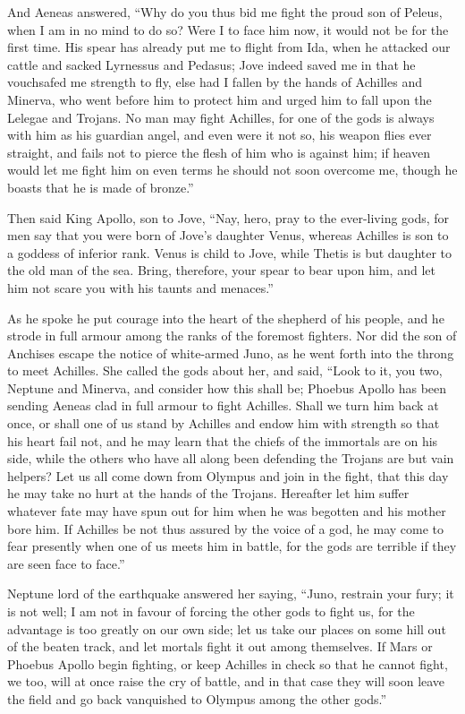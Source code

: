 And Aeneas answered, “Why do you thus bid me fight the proud son of
Peleus, when I am in no mind to do so? Were I to face him now, it would
not be for the first time. His spear has already put me to flight from
Ida, when he attacked our cattle and sacked Lyrnessus and Pedasus; Jove
indeed saved me in that he vouchsafed me strength to fly, else had I
fallen by the hands of Achilles and Minerva, who went before him to
protect him and urged him to fall upon the Lelegae and Trojans. No man may
fight Achilles, for one of the gods is always with him as his guardian
angel, and even were it not so, his weapon flies ever straight, and fails
not to pierce the flesh of him who is against him; if heaven would let me
fight him on even terms he should not soon overcome me, though he boasts
that he is made of bronze.”

Then said King Apollo, son to Jove, “Nay, hero, pray to the ever-living
gods, for men say that you were born of Jove’s daughter Venus, whereas
Achilles is son to a goddess of inferior rank. Venus is child to Jove,
while Thetis is but daughter to the old man of the sea. Bring, therefore,
your spear to bear upon him, and let him not scare you with his taunts and
menaces.”

As he spoke he put courage into the heart of the shepherd of his people,
and he strode in full armour among the ranks of the foremost fighters. Nor
did the son of Anchises escape the notice of white-armed Juno, as he went
forth into the throng to meet Achilles. She called the gods about her, and
said, “Look to it, you two, Neptune and Minerva, and consider how this
shall be; Phoebus Apollo has been sending Aeneas clad in full armour to
fight Achilles. Shall we turn him back at once, or shall one of us stand
by Achilles and endow him with strength so that his heart fail not, and he
may learn that the chiefs of the immortals are on his side, while the
others who have all along been defending the Trojans are but vain helpers?
Let us all come down from Olympus and join in the fight, that this day he
may take no hurt at the hands of the Trojans. Hereafter let him suffer
whatever fate may have spun out for him when he was begotten and his
mother bore him. If Achilles be not thus assured by the voice of a god, he
may come to fear presently when one of us meets him in battle, for the
gods are terrible if they are seen face to face.”

Neptune lord of the earthquake answered her saying, “Juno, restrain your
fury; it is not well; I am not in favour of forcing the other gods to
fight us, for the advantage is too greatly on our own side; let us take
our places on some hill out of the beaten track, and let mortals fight it
out among themselves. If Mars or Phoebus Apollo begin fighting, or keep
Achilles in check so that he cannot fight, we too, will at once raise the
cry of battle, and in that case they will soon leave the field and go back
vanquished to Olympus among the other gods.”

